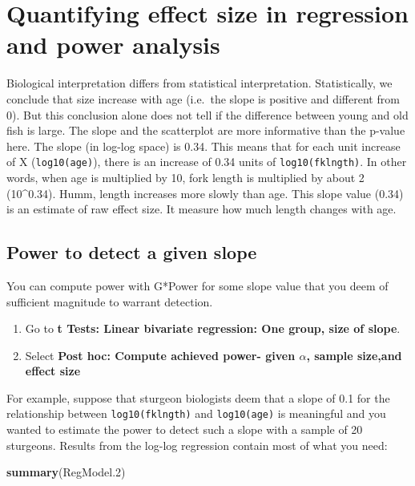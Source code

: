 \documentclass[
  12pt,
]{book}
\newenvironment{Shaded}{\begin{snugshade}}{\end{snugshade}}
\newcommand{\FloatTok}[1]{\textcolor[rgb]{0.00,0.00,0.81}{#1}}
\newcommand{\KeywordTok}[1]{\textcolor[rgb]{0.13,0.29,0.53}{\textbf{#1}}}
\newcommand{\NormalTok}[1]{#1}
\providecommand{\tightlist}{%
  \setlength{\itemsep}{0pt}\setlength{\parskip}{0pt}}
\begin{document}
\hypertarget{quantifying-effect-size-in-regression-and-power-analysis}{%
\section{Quantifying effect size in regression and power analysis}\label{quantifying-effect-size-in-regression-and-power-analysis}}

Biological interpretation differs from statistical interpretation. Statistically, we conclude that size increase with age (i.e.~the slope is positive and different from 0). But this conclusion alone does not tell if the difference between young and old fish is large. The slope and the scatterplot are more informative than the p-value here. The slope (in log-log space) is 0.34.
This means that for each unit increase of X (\texttt{log10(age)}), there is an increase of 0.34 units of \texttt{log10(fklngth)}. In other words, when age is multiplied by 10, fork length is multiplied by about 2 (10\^{}0.34). Humm, length increases more slowly than age. This slope value (0.34) is an estimate of raw effect size. It measure how much length changes with age.

\hypertarget{power-to-detect-a-given-slope}{%
\subsection{Power to detect a given slope}\label{power-to-detect-a-given-slope}}

You can compute power with G*Power for some slope value that you deem of sufficient magnitude to warrant detection.

\begin{enumerate}
\def\labelenumi{\arabic{enumi}.}
\tightlist
\item
  Go to \textbf{t Tests: Linear bivariate regression: One group, size of slope}.
\item
  Select \textbf{Post hoc: Compute achieved power- given \(\alpha\), sample size,and effect size}
\end{enumerate}

For example, suppose that sturgeon biologists deem that a slope of 0.1 for the relationship between \texttt{log10(fklngth)} and \texttt{log10(age)} is meaningful and you wanted to estimate the power to detect such a slope with a sample of 20 sturgeons. Results from the log-log regression contain most of what you need:

\begin{Shaded}
\begin{Highlighting}[]
\KeywordTok{summary}\NormalTok{(RegModel}\FloatTok{.2}\NormalTok{)}
\end{Highlighting}
\end{Shaded}
\end{document}
